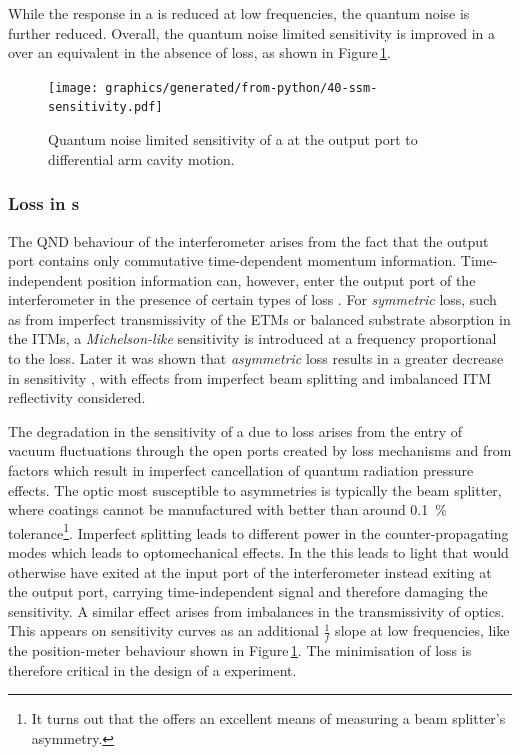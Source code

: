While the response in a \SSM{} is reduced at low frequencies, the quantum noise is further reduced. Overall, the quantum noise limited sensitivity is improved in a \SSM{} over an equivalent \FPMI{} in the absence of loss, as shown in Figure\,\ref{fig:ssm-sensitivity}.

\begin{figure}
  \centering
  \texttt{[image: graphics/generated/from-python/40-ssm-sensitivity.pdf]}
  \caption[Sensitivity of a \SSM{} at the output port to differential arm cavity motion]{\label{fig:ssm-sensitivity}Quantum noise limited sensitivity of a \SSM{} at the output port to differential arm cavity motion.}
\end{figure}

\subsubsection{Loss in \SSM{}s}
The \gls{QND} behaviour of the interferometer arises from the fact that the output port contains only commutative time-dependent momentum information. Time-independent position information can, however, enter the output port of the interferometer in the presence of certain types of loss \cite{Danilishin2004}. For \emph{symmetric} loss, such as from imperfect transmissivity of the \glspl{ETM} or balanced substrate absorption in the \glspl{ITM}, a \emph{Michelson-like} sensitivity is introduced at a frequency proportional to the loss. Later it was shown that \emph{asymmetric} loss results in a greater decrease in sensitivity \cite{Danilishin2015}, with effects from imperfect beam splitting and imbalanced \gls{ITM} reflectivity considered.

The degradation in the sensitivity of a \SSM{} due to loss arises from the entry of vacuum fluctuations through the open ports created by loss mechanisms and from factors which result in imperfect cancellation of quantum radiation pressure effects. The optic most susceptible to asymmetries is typically the beam splitter, where coatings cannot be manufactured with better than around \SI{0.1}{\percent} tolerance\footnote{It turns out that the \SSM{} offers an excellent means of measuring a beam splitter's asymmetry.}. Imperfect splitting leads to different power in the counter-propagating modes which leads to optomechanical effects. In the \SSM{} this leads to light that would otherwise have exited at the input port of the interferometer instead exiting at the output port, carrying time-independent signal and therefore damaging the sensitivity. A similar effect arises from imbalances in the transmissivity of optics. This appears on sensitivity curves as an additional $\frac{1}{f}$ slope at low frequencies, like the position-meter behaviour shown in Figure\,\ref{fig:ssm-sensitivity}. The minimisation of loss is therefore critical in the design of a \SSM{} experiment.


